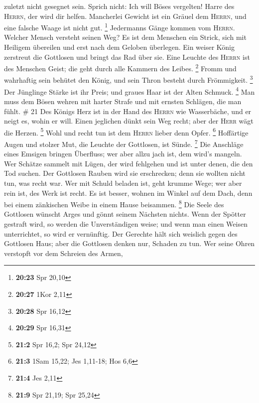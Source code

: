 zuletzt nicht gesegnet sein.  Sprich nicht: Ich will
Böses vergelten! Harre des \textsc{Herrn}, der wird dir helfen.
 Mancherlei Gewicht ist ein Gräuel dem \textsc{Herrn},
und eine falsche Waage ist nicht gut. \footnote{\textbf{20:23} Spr 20,10}
 Jedermanns Gänge kommen vom \textsc{Herrn}. Welcher
Mensch versteht seinen Weg?  Es ist dem Menschen ein
Strick, sich mit Heiligem übereilen und erst nach dem Geloben überlegen.
 Ein weiser König zerstreut die Gottlosen und bringt das
Rad über sie.  Eine Leuchte des \textsc{Herrn} ist des
Menschen Geist; die geht durch alle Kammern des Leibes. \footnote{\textbf{20:27}
  1Kor 2,11}  Fromm und wahrhaftig sein behütet den
König, und sein Thron besteht durch Frömmigkeit. \footnote{\textbf{20:28}
  Spr 16,12}  Der Jünglinge Stärke ist ihr Preis; und
graues Haar ist der Alten Schmuck. \footnote{\textbf{20:29} Spr 16,31}
 Man muss dem Bösen wehren mit harter Strafe und mit
ernsten Schlägen, die man fühlt. \# 21  Des Königs Herz
ist in der Hand des \textsc{Herrn} wie Wasserbäche, und er neigt es,
wohin er will.  Einen jeglichen dünkt sein Weg recht; aber
der \textsc{Herr} wägt die Herzen. \footnote{\textbf{21:2} Spr 16,2; Spr
  24,12}  Wohl und recht tun ist dem \textsc{Herrn} lieber
denn Opfer. \footnote{\textbf{21:3} 1Sam 15,22; Jes 1,11-18; Hos 6,6}
 Hoffärtige Augen und stolzer Mut, die Leuchte der
Gottlosen, ist Sünde. \footnote{\textbf{21:4} Jes 2,11} 
Die Anschläge eines Emsigen bringen Überfluss; wer aber allzu jach ist,
dem wird's mangeln.  Wer Schätze sammelt mit Lügen, der
wird fehlgehen und ist unter denen, die den Tod suchen. 
Der Gottlosen Rauben wird sie erschrecken; denn sie wollten nicht tun,
was recht war.  Wer mit Schuld beladen ist, geht krumme
Wege; wer aber rein ist, des Werk ist recht.  Es ist
besser, wohnen im Winkel auf dem Dach, denn bei einem zänkischen Weibe
in einem Hause beisammen. \footnote{\textbf{21:9} Spr 21,19; Spr 25,24}
 Die Seele des Gottlosen wünscht Arges und gönnt seinem
Nächsten nichts.  Wenn der Spötter gestraft wird, so
werden die Unverständigen weise; und wenn man einen Weisen unterrichtet,
so wird er vernünftig.  Der Gerechte hält sich weislich
gegen des Gottlosen Haus; aber die Gottlosen denken nur, Schaden zu tun.
 Wer seine Ohren verstopft vor dem Schreien des Armen,
